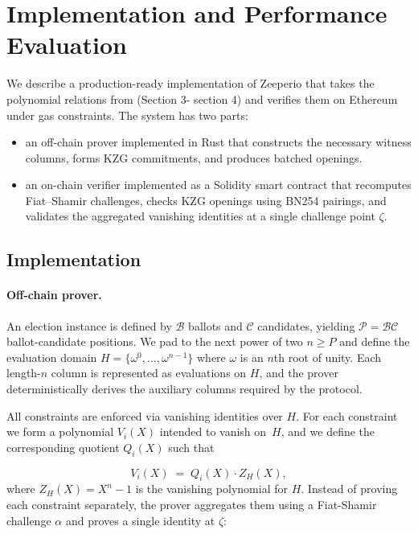 \section{Implementation and Performance Evaluation}

We describe a production-ready implementation of Zeeperio that takes the
polynomial relations from (Section 3- section 4) and verifies
them on Ethereum under gas constraints. 
The system has two parts:
\begin{itemize}
  \item an off-chain prover implemented in Rust that constructs the necessary
  witness columns, forms KZG commitments, and produces batched openings.
  \item an on-chain verifier implemented as a Solidity smart contract that
  recomputes Fiat--Shamir challenges, checks KZG openings using BN254 pairings,
  and validates the aggregated vanishing identities at a single challenge point $\zeta$.
\end{itemize}



\subsection{Implementation}

\paragraph{Off-chain prover.}
An election instance is defined by $\mathcal{B}$ ballots and $\mathcal{C}$ candidates, yielding $\mathcal{P}=\mathcal{B}\mathcal{C}$ ballot-candidate
positions. We pad to the next power of two $n\ge P$ and define the evaluation
domain $H=\{\omega^0,\ldots,\omega^{n-1}\}$ where $\omega$ is an $n$th root of
unity. Each length-$n$ column is represented as evaluations on $H$, and the prover deterministically derives the auxiliary columns
required by the protocol.

All constraints are enforced via vanishing identities over $H$. For each
constraint we form a polynomial $V_i(X)$ intended to vanish on~$H$, and we
define the corresponding quotient $Q_i(X)$ such that

\begin{equation*}
  V_i(X) \;=\; Q_i(X)\cdot Z_H(X), 
\end{equation*}
where $Z_H(X)=X^n-1$ is the vanishing polynomial for $H$. 
Instead of proving each constraint separately, the prover aggregates them using a
Fiat-Shamir challenge $\alpha$ and proves a single identity at $\zeta$:

